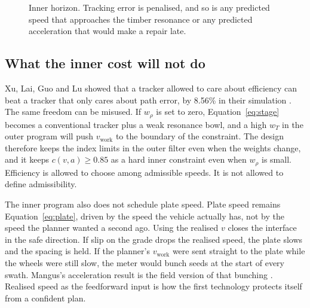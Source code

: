 \begin{figure}[ht]
\centering
{}
\caption{Inner horizon. Tracking error is penalised, and so is any predicted speed that approaches the timber resonance or any predicted acceleration that would make a repair late.}
\label{fig:horizon}
\end{figure}

\subsection{What the inner cost will not do}

Xu, Lai, Guo and Lu showed that a tracker allowed to care about efficiency can beat a tracker that only cares about path error, by \num{8.56}\% in their simulation \cite{xu2022}. The same freedom can be misused. If \(w_{\rho}\) is set to zero, Equation~\eqref{eq:stage} becomes a conventional tracker plus a weak resonance bowl, and a high \(w_T\) in the outer program will push \(v_{\mathrm{work}}\) to the boundary of the constraint. The design therefore keeps the index limits in the outer filter even when the weights change, and it keeps \(c(v,a)\ge 0.85\) as a hard inner constraint even when \(w_{\rho}\) is small. Efficiency is allowed to choose among admissible speeds. It is not allowed to define admissibility.

The inner program also does not schedule plate speed. Plate speed remains Equation~\eqref{eq:plate}, driven by the speed the vehicle actually has, not by the speed the planner wanted a second ago. Using the realised \(v\) closes the interface in the safe direction. If slip on the grade drops the realised speed, the plate slows and the spacing is held. If the planner's \(v_{\mathrm{work}}\) were sent straight to the plate while the wheels were still slow, the meter would bunch seeds at the start of every swath. Mangus's acceleration result is the field version of that bunching \cite{mangus2017}. Realised speed as the feedforward input is how the first technology protects itself from a confident plan.

